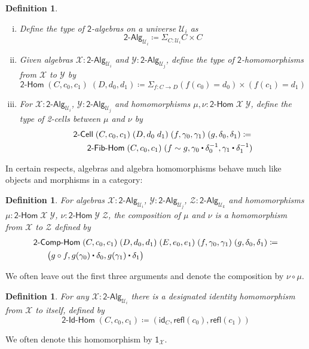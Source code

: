 \documentclass[reqno,10pt,a4paper,oneside]{amsart}
\newcommand{\X}{\mathcal{X}}
\newcommand{\Y}{\mathcal{Y}}
\newcommand{\Z}{\mathcal{Z}}
\newcommand{\comp}{\circ}
\newcommand{\idfun}[1]{\mathsf{id}_{#1}}
\newcommand{\sm}[1]{\Sigma_{#1}}
\newcommand{\defeq}{\coloneqq}
\newcommand{\refl}{\mathsf{refl}}
\newcommand{\Bool}{\mathsf{2}}
\newcommand{\one}{\mathsf{1}}
\newcommand{\UU}{\mathcal{U}}
\newcommand{\BoolAlg}{\mathsf{2}\text{-}\mathsf{Alg}}
\newcommand{\BoolHom}{\mathsf{2}\text{-}\mathsf{Hom}}
\newcommand{\BoolCell}{\mathsf{2}\text{-}\mathsf{Cell}}
\newcommand{\BoolFibHom}{\mathsf{2}\text{-}\mathsf{Fib}\text{-}\mathsf{Hom}}
\newcommand{\BoolIdHom}{\mathsf{2}\text{-}\mathsf{Id}\text{-}\mathsf{Hom}}
\newcommand{\BoolCompHom}{\mathsf{2}\text{-}\mathsf{Comp}\text{-}\mathsf{Hom}}
\newcommand{\ct}{%
  \mathchoice{\mathbin{\raisebox{0.5ex}{$\displaystyle\centerdot$}}}%
             {\mathbin{\raisebox{0.5ex}{$\centerdot$}}}%
             {\mathbin{\raisebox{0.25ex}{$\scriptstyle\,\centerdot\,$}}}%
             {\mathbin{\raisebox{0.1ex}{$\scriptscriptstyle\,\centerdot\,$}}}}
\numberwithin{equation}{section}
\theoremstyle{mythm}
\theoremstyle{mydef}
\newtheorem{definition}[theorem]{Definition}
\theoremstyle{myrmk}
\begin{document}
\begin{definition}\label{def:BoolAlg} \label{def:BoolHom} \label{def:BoolCell} \hfill
\begin{enumerate}[(i)]
\item  Define the type of \emph{$\Bool$-algebras} on a universe $\UU_i$ as 
\[
\BoolAlg_{\UU_i} 
\defeq 
\sm{C : \UU_i} C \times C 
\] 
\item Given algebras $\X : \BoolAlg_{\UU_i}$ and $\Y : \BoolAlg_{\UU_j}$, define the type of \emph{$\Bool$-homomorphisms} from $\X$ to $\Y$ by \[\BoolHom \; (C,c_0,c_1) \; (D,d_0,d_1) \defeq \sm{f:C \to D} (f(c_0) = d_0) \times (f(c_1) = d_1) \]
\item For $\X : \BoolAlg_{\UU_i}$, $\Y : \BoolAlg_{\UU_j}$ and homomorphisms $\mu, \nu : \BoolHom \; \X \; \Y$, define the type of \emph{2-cells} between $\mu$ and $\nu$ by
\begin{align*} & \BoolCell \; (C,c_0,c_1) \; (D, d_0 \; d_1) \; (f,\gamma_0,\gamma_1) \; (g,\delta_0,\delta_1) \defeq \\ & \;\;\; \;\;\;\BoolFibHom \; (C,c_0,c_1) \; (f \sim g, \gamma_0 \ct \delta_0^{-1}, \gamma_1 \ct \delta_1^{-1})
\end{align*}
\end{enumerate}
\end{definition}


In certain respects, algebras and algebra homomorphisms behave much like objects and morphisms in a category:

\begin{definition}
For algebras $\X : \BoolAlg_{\UU_i}$, $\Y : \BoolAlg_{\UU_j}$, $\Z : \BoolAlg_{\UU_k}$ and homomorphisms $\mu : \BoolHom \; \X \; \Y$, $\nu : \BoolHom \; \Y \; \Z$, the \emph{composition} of $\mu$ and $\nu$ is a homomorphism from $\X$ to $\Z$ defined by
\begin{align*} & \BoolCompHom \; (C,c_0,c_1) \; (D,d_0,d_1) \; (E,e_0,e_1) \; (f,\gamma_0,\gamma_1) \; (g,\delta_0,\delta_1) \defeq \\ & \;\;\;\;\;\; \big(g \comp f, g(\gamma_0) \ct \delta_0, g(\gamma_1) \ct \delta_1\big)
\end{align*}
\end{definition}
We often leave out the first three arguments and denote the composition by $\nu \comp \mu$.

\begin{definition}
For any $\X : \BoolAlg_{\UU_i}$ there is a designated \emph{identity} homomorphism from $\X$ to itself, defined by
\[ \BoolIdHom \; (C,c_0,c_1) \defeq (\idfun{C}, \refl(c_0), \refl(c_1)) \]
\end{definition}
We often denote this homomorphism by $\one_\X$.
\end{document}
